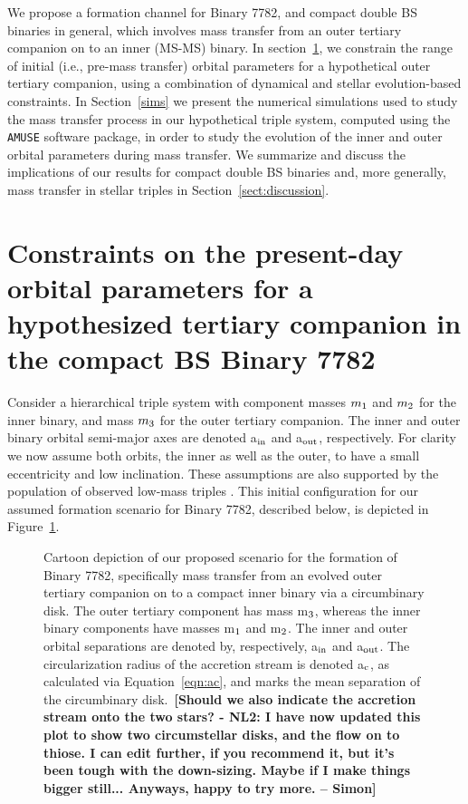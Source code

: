 \documentclass{aastex62}
\def\simon#1{{\bf {\color{red}[#1 -- Simon]}}}
\begin{document}
{We propose a formation channel for Binary 7782, and compact double BS
binaries in general, which involves mass transfer from an outer
tertiary companion on to an inner (MS-MS) binary.  In
section~\ref{sect:dyn}, we constrain the range of initial (i.e., pre-mass
transfer) orbital parameters for a hypothetical outer tertiary
companion, using a combination of dynamical and stellar
evolution-based constraints.  In Section~\ref{sims} we present the
numerical simulations used to study the mass transfer process in our
hypothetical triple system, computed using the
\texttt{AMUSE}\cite{AMUSE} software package, in order to study the
evolution of the inner and outer orbital parameters during mass
transfer.  We summarize and discuss the implications of our results
for compact double BS binaries and, more generally, mass transfer in
stellar triples in Section~\ref{sect:discussion}.

\section{Constraints on the present-day orbital parameters for a hypothesized
         tertiary companion in the compact BS Binary 7782} \label{sect:dyn}

Consider a hierarchical triple system with component masses $m_{\rm
  1}$ and $m_{\rm 2}$ for the inner binary, and mass $m_{\rm 3}$ for
the outer tertiary companion.  The inner and outer binary orbital
semi-major axes are denoted a$_{\rm in}$ and a$_{\rm out}$,
respectively.  For clarity we now assume both orbits, the inner as
well as the outer, to have a small eccentricity and low inclination.
These assumptions are also supported by the population of observed
low-mass triples \cite{2010yCat..73890925T,moe18}.  This initial
configuration for our assumed formation scenario for Binary 7782,
described below, is depicted in Figure~\ref{fig:fig1}.

\begin{figure}[ht!]
\caption{Cartoon depiction of our proposed scenario for the formation
  of Binary 7782, specifically mass transfer from an evolved outer
  tertiary companion on to a compact inner binary via a circumbinary
  disk.  The outer tertiary component has mass m$_{\rm 3}$, whereas
  the inner binary components have masses m$_{\rm 1}$ and m$_{\rm 2}$.
  The inner and outer orbital separations are denoted by,
  respectively, a$_{\rm in}$ and a$_{\rm out}$.  The circularization
  radius of the accretion stream is denoted a$_{\rm c}$, as calculated
  via Equation~\ref{eqn:ac}, and marks the mean separation of the
  circumbinary disk.\
  \simon{Should we also indicate the accretion stream onto the two stars? - NL2:  I have now updated this plot to show two circumstellar disks, and the flow on to thiose.  I can edit further, if you recommend it, but it's been tough with the down-sizing.  Maybe if I make things bigger still...  Anyways, happy to try more.}
\label{fig:fig1}}
\end{figure}

}
\end{document}
